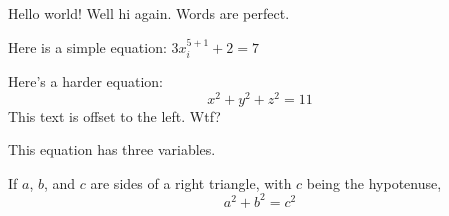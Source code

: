 \documentclass{article}
\begin{document}
Hello world!
Well hi again.  Words are perfect.

Here is a simple equation: $3x_i^{5+1}+2=7$

Here's a harder equation:
$$x^2+y^2 + z^2 = 11$$
This text is offset to the left.  Wtf?

This equation has three variables.

If $a$, $b$, and $c$ are sides of a right triangle, with $c$ being the hypotenuse,
$$a^2 + b^2 = c^2$$
\end{document}

